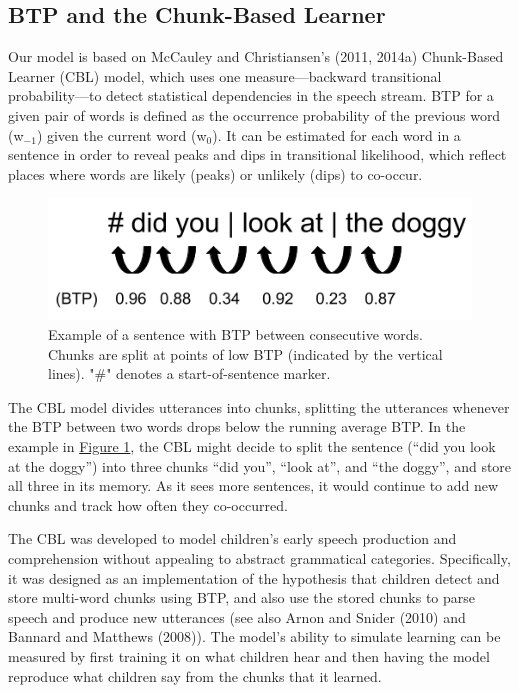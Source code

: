 \documentclass[man,mask,floatsintext]{apa6}
\begin{document}
\subsection{BTP and the Chunk-Based
Learner}\label{btp-and-the-chunk-based-learner}

Our model is based on McCauley and Christiansen's (2011, 2014a)
Chunk-Based Learner (CBL) model, which uses one measure---backward
transitional probability---to detect statistical dependencies in the
speech stream. BTP for a given pair of words is defined as the
occurrence probability of the previous word (w\(_{-1}\)) given the
current word (w\(_0\)). It can be estimated for each word in a sentence
in order to reveal peaks and dips in transitional likelihood, which
reflect places where words are likely (peaks) or unlikely (dips) to
co-occur.

\begin{figure}

{\centering \includegraphics[width=0.95\linewidth]{images/chunking_mechanism} 

}

\caption{Example of a sentence with BTP between consecutive words. Chunks are split at points of low BTP (indicated by the vertical lines). "\#" denotes a start-of-sentence marker.}\label{fig:fig1}
\end{figure}

The CBL model divides utterances into chunks, splitting the utterances
whenever the BTP between two words drops below the running average BTP.
In the example in \protect\hyperlink{fig1}{Figure 1}, the CBL might
decide to split the sentence (\enquote{did you look at the doggy}) into
three chunks \enquote{did you}, \enquote{look at}, and \enquote{the
doggy}, and store all three in its memory. As it sees more sentences, it
would continue to add new chunks and track how often they co-occurred.

The CBL was developed to model children's early speech production and
comprehension without appealing to abstract grammatical categories.
Specifically, it was designed as an implementation of the hypothesis
that children detect and store multi-word chunks using BTP, and also use
the stored chunks to parse speech and produce new utterances (see also
Arnon and Snider (2010) and Bannard and Matthews (2008)). The model's
ability to simulate learning can be measured by first training it on
what children hear and then having the model reproduce what children say
from the chunks that it learned.
\end{document}
